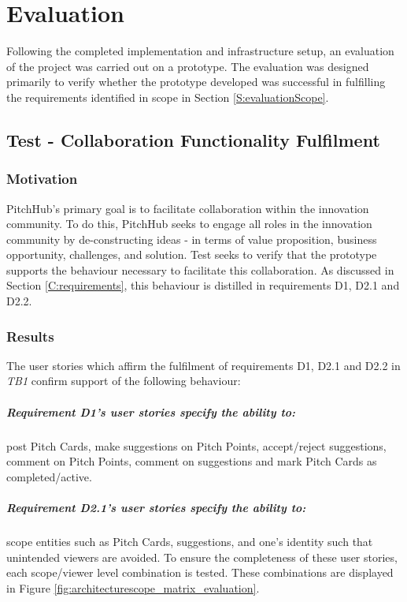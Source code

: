 \chapter{Evaluation}
Following the completed implementation and infrastructure setup, an evaluation of the project was carried out on a prototype. The evaluation was designed primarily to verify whether the prototype developed was successful in fulfilling the requirements identified in scope in Section \ref{S:evaluationScope}.

\section{Test  - Collaboration Functionality Fulfilment}

\subsection{Motivation}
PitchHub's primary goal is to facilitate collaboration within the innovation community. To do this, PitchHub seeks to engage all roles in the innovation community by de-constructing ideas - in terms of  value proposition, business opportunity, challenges, and solution. Test  seeks to verify that the prototype supports the behaviour necessary to facilitate this collaboration. As discussed in Section \ref{C:requirements}, this behaviour is distilled in requirements D1, D2.1 and D2.2.

\subsection{Results}
The user stories which affirm the fulfilment of requirements D1, D2.1 and D2.2 in \textit{TB1} confirm support of the following behaviour:

\paragraph{Requirement D1's user stories specify the ability to:} post Pitch Cards, make suggestions on Pitch Points, accept/reject suggestions, comment on Pitch Points, comment on suggestions and mark Pitch Cards as completed/active.

\paragraph{Requirement D2.1's user stories specify the ability to:} scope entities such as Pitch Cards, suggestions, and one's identity such that unintended viewers are avoided. To ensure the completeness of these user stories, each scope/viewer level combination is tested. These combinations are displayed in Figure \ref{fig:architecturescope_matrix_evaluation}.


